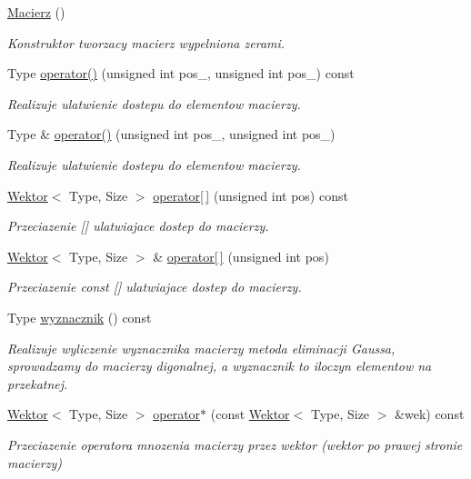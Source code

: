 \begin{DoxyCompactItemize}
\item 
\hyperlink{class_macierz_af94b65613b430a10008d6755597a0427}{Macierz} ()
\begin{DoxyCompactList}\small\item\em Konstruktor tworzacy macierz wypelniona zerami. \end{DoxyCompactList}\item 
Type \hyperlink{class_macierz_a4bbddc3fc040c6bb57d07a0ed75fd3f8}{operator()} (unsigned int pos\+\_, unsigned int pos\+\_) const
\begin{DoxyCompactList}\small\item\em Realizuje ulatwienie dostepu do elementow macierzy. \end{DoxyCompactList}\item 
Type \& \hyperlink{class_macierz_a27711c64282d546383e97cbc76748327}{operator()} (unsigned int pos\+\_, unsigned int pos\+\_)
\begin{DoxyCompactList}\small\item\em Realizuje ulatwienie dostepu do elementow macierzy. \end{DoxyCompactList}\item 
\hyperlink{class_wektor}{Wektor}$<$ Type, Size $>$ \hyperlink{class_macierz_abc3718ee888a07f9b1f6bc60447efb8d}{operator\mbox{[}$\,$\mbox{]}} (unsigned int pos) const
\begin{DoxyCompactList}\small\item\em Przeciazenie \mbox{[}\mbox{]} ulatwiajace dostep do macierzy. \end{DoxyCompactList}\item 
\hyperlink{class_wektor}{Wektor}$<$ Type, Size $>$ \& \hyperlink{class_macierz_adc2e2b93aa5b4079a756142e4d8402d1}{operator\mbox{[}$\,$\mbox{]}} (unsigned int pos)
\begin{DoxyCompactList}\small\item\em Przeciazenie const \mbox{[}\mbox{]} ulatwiajace dostep do macierzy. \end{DoxyCompactList}\item 
Type \hyperlink{class_macierz_a24a6eb57bea1568d7e4aecc342bb2461}{wyznacznik} () const
\begin{DoxyCompactList}\small\item\em Realizuje wyliczenie wyznacznika macierzy metoda eliminacji Gaussa, sprowadzamy do macierzy digonalnej, a wyznacznik to iloczyn elementow na przekatnej. \end{DoxyCompactList}\item 
\hyperlink{class_wektor}{Wektor}$<$ Type, Size $>$ \hyperlink{class_macierz_a16423e4cf46347d8464c9e3305e895fa}{operator$\ast$} (const \hyperlink{class_wektor}{Wektor}$<$ Type, Size $>$ \&wek) const
\begin{DoxyCompactList}\small\item\em Przeciazenie operatora mnozenia macierzy przez wektor (wektor po prawej stronie macierzy) \end{DoxyCompactList}\end{DoxyCompactItemize}
